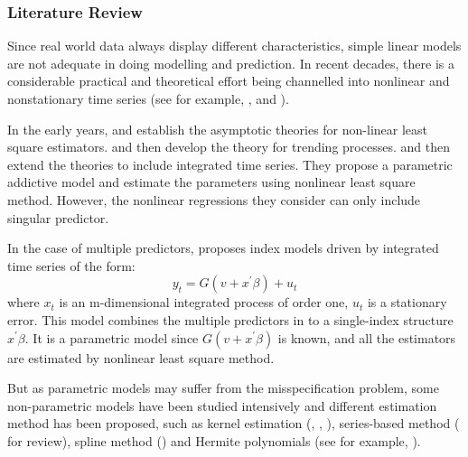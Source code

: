 \documentclass[a4paper,12pt,times,numbered,print,index]{report}
\numberwithin{equation}{section}
\begin{document}
\subsubsection{Literature Review}
Since real world data always display different characteristics, simple linear models are not adequate in doing modelling and prediction. In recent decades, there is a considerable practical and theoretical effort being channelled into nonlinear and nonstationary time series (see for example, \cite{park2001nonlinear}, \cite{park2002nonstationary} and \cite{gao2009nonparametric}). 

In the early years, \cite{jennrich1969asymptotic} and \cite{wu1981asymptotic} establish the asymptotic theories for non-linear least square estimators. \cite{wooldridge1994estimation} and \cite{andrews1995nonlinear} then develop the theory for trending processes. \cite{park2001nonlinear} and \cite{chang2001nonlinear} then extend the theories to include integrated time series. They propose a parametric addictive model and estimate the parameters using nonlinear least square method. However, the nonlinear regressions they consider can only include singular predictor. 

In the case of multiple predictors, \cite{chang2003index} proposes index models driven by integrated time series of the form:
$$
y_t = G(v+x^{\prime}\beta) + u_t
$$
where $x_t$ is an m-dimensional integrated process of order one, $u_t$ is a stationary error. 
This model combines the multiple predictors in to a single-index structure $x^{\prime}\beta$. It is a parametric model since $G(v+x^{\prime}\beta)$ is known, and  all the estimators are estimated by nonlinear least square method.

But as parametric models may suffer from the misspecification problem, some non-parametric models have been studied intensively and different estimation method has been proposed, such as kernel estimation (\cite{xia2006semi}, \cite{ma2015varying}, \cite{birke2017semi}), series-based method (\cite{chen2007large} for review), spline method (\cite{yu2002penalized}) and Hermite polynomials (see for example, \cite{dong2015semiparametric}). 
\end{document}

